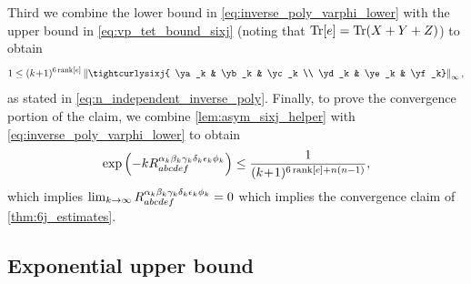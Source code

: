 \documentclass[notitlepage, 11pt, letterpaper]{amsart}
\begin{document}
Third we combine the lower bound in \cref{eq:inverse_poly_varphi_lower} with the upper bound in \cref{eq:vp_tet_bound_sixj} (noting that $\operatorname{Tr}[e] = \operatorname{Tr}(X+Y+Z)$) to obtain
\begin{equation}
    1 \leq \polyk{6\rank[\ee]} \norm{\tightcurlysixj{ \ya_k & \yb_k & \yc_k \\ \yd_k &  \ye_k &  \yf_k}}_{\infty},
\end{equation}
as stated in \cref{eq:n_independent_inverse_poly}.
Finally, to prove the convergence portion of the claim, we combine \cref{lem:asym_sixj_helper} with \cref{eq:inverse_poly_varphi_lower} to obtain
\begin{equation}
    \exp\left(- k R_{abcdef}^{\alpha_k\beta_k\gamma_k\delta_k\epsilon_k\phi_k}\right) \leq \frac{1}{(k\!+\!1)^{6\operatorname{rank}[e] + n(n-1)}},
\end{equation}
which implies $\lim_{k\to \infty} R_{abcdef}^{\alpha_k\beta_k\gamma_k\delta_k\epsilon_k\phi_k} = 0$ which implies the convergence claim of \cref{thm:6j_estimates}.

\subsection{Exponential upper bound}
\label{sec:6j_exp}
\end{document}
